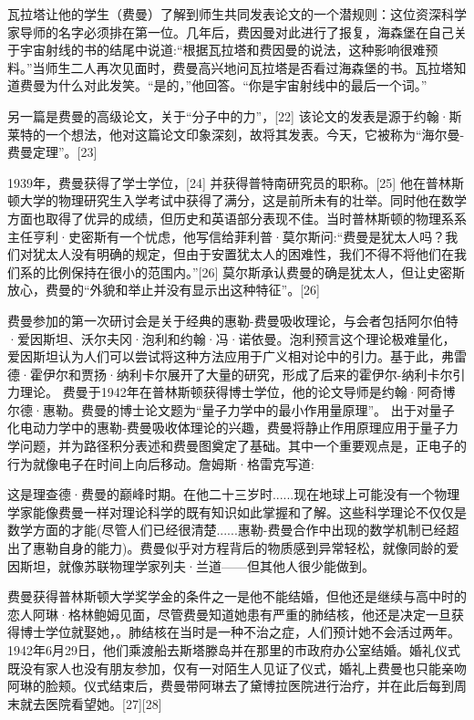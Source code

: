 瓦拉塔让他的学生（费曼）了解到师生共同发表论文的一个潜规则：这位资深科学家导师的名字必须排在第一位。几年后，费因曼对此进行了报复，海森堡在自己关于宇宙射线的书的结尾中说道:“根据瓦拉塔和费因曼的说法，这种影响很难预料。”当师生二人再次见面时，费曼高兴地问瓦拉塔是否看过海森堡的书。瓦拉塔知道费曼为什么对此发笑。“是的，”他回答。“你是宇宙射线中的最后一个词。”

另一篇是费曼的高级论文，关于“分子中的力”，[22] 该论文的发表是源于约翰·斯莱特的一个想法，他对这篇论文印象深刻，故将其发表。今天，它被称为“海尔曼-费曼定理”。[23]

1939年，费曼获得了学士学位，[24] 并获得普特南研究员的职称。[25] 他在普林斯顿大学的物理研究生入学考试中获得了满分，这是前所未有的壮举。同时他在数学方面也取得了优异的成绩，但历史和英语部分表现不佳。当时普林斯顿的物理系系主任亨利·史密斯有一个忧虑，他写信给菲利普·莫尔斯问:“费曼是犹太人吗？我们对犹太人没有明确的规定，但由于安置犹太人的困难性，我们不得不将他们在我们系的比例保持在很小的范围内。”[26] 莫尔斯承认费曼的确是犹太人，但让史密斯放心，费曼的“外貌和举止并没有显示出这种特征”。[26]

费曼参加的第一次研讨会是关于经典的惠勒-费曼吸收理论，与会者包括阿尔伯特·爱因斯坦、沃尔夫冈·泡利和约翰·冯·诺依曼。泡利预言这个理论极难量化，爱因斯坦认为人们可以尝试将这种方法应用于广义相对论中的引力。基于此，弗雷德·霍伊尔和贾扬·纳利卡尔展开了大量的研究，形成了后来的霍伊尔-纳利卡尔引力理论。 费曼于1942年在普林斯顿获得博士学位，他的论文导师是约翰·阿奇博尔德·惠勒。费曼的博士论文题为“量子力学中的最小作用量原理”。 出于对量子化电动力学中的惠勒-费曼吸收体理论的兴趣，费曼将静止作用原理应用于量子力学问题，并为路径积分表述和费曼图奠定了基础。其中一个重要观点是，正电子的行为就像电子在时间上向后移动。詹姆斯·格雷克写道:

这是理查德·费曼的巅峰时期。在他二十三岁时......现在地球上可能没有一个物理学家能像费曼一样对理论科学的既有知识如此掌握和了解。这些科学理论不仅仅是数学方面的才能(尽管人们已经很清楚......惠勒-费曼合作中出现的数学机制已经超出了惠勒自身的能力)。费曼似乎对方程背后的物质感到异常轻松，就像同龄的爱因斯坦，就像苏联物理学家列夫·兰道——但其他人很少能做到。

费曼获得普林斯顿大学奖学金的条件之一是他不能结婚，但他还是继续与高中时的恋人阿琳·格林鲍姆见面，尽管费曼知道她患有严重的肺结核，他还是决定一旦获得博士学位就娶她，。肺结核在当时是一种不治之症，人们预计她不会活过两年。1942年6月29日，他们乘渡船去斯塔滕岛并在那里的市政府办公室结婚。婚礼仪式既没有家人也没有朋友参加，仅有一对陌生人见证了仪式，婚礼上费曼也只能亲吻阿琳的脸颊。仪式结束后，费曼带阿琳去了黛博拉医院进行治疗，并在此后每到周末就去医院看望她。[27][28]

